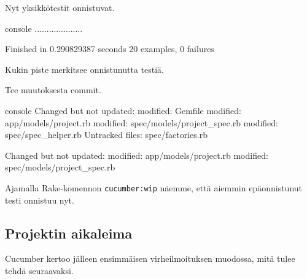 \documentclass{article}
\begin{document}
\begin{samepage}
Nyt yksikkötestit onnistuvat.

\begin{pygmented}{console}
....................

Finished in 0.290829387 seconds
20 examples, 0 failures
\end{pygmented}

Kukin piste merkitsee onnistunutta testiä.
\end{samepage}

\begin{samepage}
Tee muutoksesta commit.

\begin{pygmented}{console}
  Changed but not updated:
        modified:   Gemfile
        modified:   app/models/project.rb
        modified:   spec/models/project_spec.rb
        modified:   spec/spec_helper.rb
  Untracked files:
        spec/factories.rb

  Changed but not updated:
        modified:   app/models/project.rb
        modified:   spec/models/project_spec.rb
\end{pygmented}
\end{samepage}

Ajamalla Rake-komennon \texttt{cucumber:wip} näemme, että aiemmin epäonnistunut
testi onnistuu nyt.

\subsection{Projektin aikaleima}

\begin{samepage}
Cucumber kertoo jälleen ensimmäisen virheilmoituksen muodossa, mitä tulee tehdä
seuraavaksi.

\end{samepage}
\end{document}
